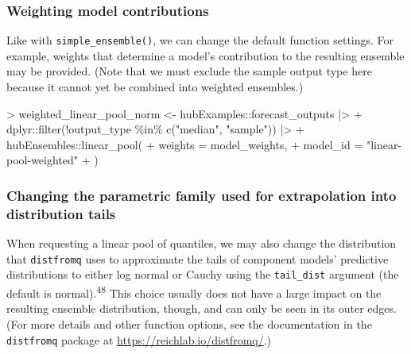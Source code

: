 \documentclass[
]{article}
\newenvironment{Shaded}{\begin{snugshade}}{\end{snugshade}}
\newcommand{\AttributeTok}[1]{\textcolor[rgb]{0.40,0.45,0.13}{#1}}
\newcommand{\FunctionTok}[1]{\textcolor[rgb]{0.28,0.35,0.67}{#1}}
\newcommand{\NormalTok}[1]{\textcolor[rgb]{0.00,0.23,0.31}{#1}}
\newcommand{\OtherTok}[1]{\textcolor[rgb]{0.00,0.23,0.31}{#1}}
\newcommand{\SpecialCharTok}[1]{\textcolor[rgb]{0.37,0.37,0.37}{#1}}
\newcommand{\StringTok}[1]{\textcolor[rgb]{0.13,0.47,0.30}{#1}}
\begin{document}
\subsubsection{Weighting model
contributions}\label{weighting-model-contributions-1}

Like with \texttt{simple\_ensemble()}, we can change the default
function settings. For example, weights that determine a model's
contribution to the resulting ensemble may be provided. (Note that we
must exclude the sample output type here because it cannot yet be
combined into weighted ensembles.)

\begin{Shaded}
\begin{Highlighting}[]
\SpecialCharTok{\textgreater{}}\NormalTok{ weighted\_linear\_pool\_norm }\OtherTok{\textless{}{-}}\NormalTok{ hubExamples}\SpecialCharTok{::}\NormalTok{forecast\_outputs }\SpecialCharTok{|\textgreater{}}
\SpecialCharTok{+}\NormalTok{   dplyr}\SpecialCharTok{::}\FunctionTok{filter}\NormalTok{(}\SpecialCharTok{!}\NormalTok{output\_type }\SpecialCharTok{\%in\%} \FunctionTok{c}\NormalTok{(}\StringTok{"median"}\NormalTok{, }\StringTok{"sample"}\NormalTok{)) }\SpecialCharTok{|\textgreater{}}
\SpecialCharTok{+}\NormalTok{   hubEnsembles}\SpecialCharTok{::}\FunctionTok{linear\_pool}\NormalTok{(}
\SpecialCharTok{+}     \AttributeTok{weights =}\NormalTok{ model\_weights,}
\SpecialCharTok{+}     \AttributeTok{model\_id =} \StringTok{"linear{-}pool{-}weighted"}
\SpecialCharTok{+}\NormalTok{ )}
\end{Highlighting}
\end{Shaded}

\subsubsection{Changing the parametric family used for extrapolation
into distribution
tails}\label{changing-the-parametric-family-used-for-extrapolation-into-distribution-tails}

When requesting a linear pool of quantiles, we may also change the
distribution that \texttt{distfromq} uses to approximate the tails of
component models' predictive distributions to either log normal or
Cauchy using the \texttt{tail\_dist} argument (the default is
normal).\textsuperscript{48} This choice usually does not have a large
impact on the resulting ensemble distribution, though, and can only be
seen in its outer edges. (For more details and other function options,
see the documentation in the \texttt{distfromq} package at
\url{https://reichlab.io/distfromq/}.)
\end{document}

